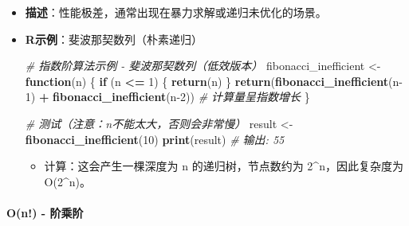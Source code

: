 \documentclass[
]{book}
\newenvironment{Shaded}{\begin{snugshade}}{\end{snugshade}}
\newcommand{\CommentTok}[1]{\textcolor[rgb]{0.56,0.35,0.01}{\textit{#1}}}
\newcommand{\ControlFlowTok}[1]{\textcolor[rgb]{0.13,0.29,0.53}{\textbf{#1}}}
\newcommand{\DecValTok}[1]{\textcolor[rgb]{0.00,0.00,0.81}{#1}}
\newcommand{\FunctionTok}[1]{\textcolor[rgb]{0.13,0.29,0.53}{\textbf{#1}}}
\newcommand{\NormalTok}[1]{#1}
\newcommand{\OtherTok}[1]{\textcolor[rgb]{0.56,0.35,0.01}{#1}}
\newcommand{\SpecialCharTok}[1]{\textcolor[rgb]{0.81,0.36,0.00}{\textbf{#1}}}
\providecommand{\tightlist}{%
  \setlength{\itemsep}{0pt}\setlength{\parskip}{0pt}}
\begin{document}
\begin{itemize}
\item
  \textbf{描述}：性能极差，通常出现在暴力求解或递归未优化的场景。
\item
  \textbf{R示例}：斐波那契数列（朴素递归）

\begin{Shaded}
\begin{Highlighting}[]
\CommentTok{\# 指数阶算法示例 {-} 斐波那契数列（低效版本）}
\NormalTok{fibonacci\_inefficient }\OtherTok{\textless{}{-}} \ControlFlowTok{function}\NormalTok{(n) \{}
  \ControlFlowTok{if}\NormalTok{ (n }\SpecialCharTok{\textless{}=} \DecValTok{1}\NormalTok{) \{}
    \FunctionTok{return}\NormalTok{(n)}
\NormalTok{  \}}
  \FunctionTok{return}\NormalTok{(}\FunctionTok{fibonacci\_inefficient}\NormalTok{(n}\DecValTok{{-}1}\NormalTok{) }\SpecialCharTok{+} \FunctionTok{fibonacci\_inefficient}\NormalTok{(n}\DecValTok{{-}2}\NormalTok{))  }\CommentTok{\# 计算量呈指数增长}
\NormalTok{\}}

\CommentTok{\# 测试（注意：n不能太大，否则会非常慢）}
\NormalTok{result }\OtherTok{\textless{}{-}} \FunctionTok{fibonacci\_inefficient}\NormalTok{(}\DecValTok{10}\NormalTok{)}
\FunctionTok{print}\NormalTok{(result)  }\CommentTok{\# 输出: 55}
\end{Highlighting}
\end{Shaded}

  \begin{itemize}
  \tightlist
  \item
    计算：这会产生一棵深度为 n 的递归树，节点数约为 2\^{}n，因此复杂度为 O(2\^{}n)。
  \end{itemize}
\end{itemize}

\hypertarget{on---ux9636ux4e58ux9636}{%
\paragraph{O(n!) - 阶乘阶}\label{on---ux9636ux4e58ux9636}}
\end{document}
